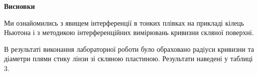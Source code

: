 \begin{center}
    \Large{\textbf{Висновки}}    
\end{center}

\vspace{1mm}

Ми ознайомились з явищем інтерференції в тонких плівках
на прикладі кілець Ньютона і з методикою інтерференційних вимірювань
кривизни скляної поверхні.


В результаті виконання лабораторної роботи було обраховано
радіуси кривизни та діаметри плями стику лінзи зі скляною пластиною.
Результати наведені у таблиці 3.

